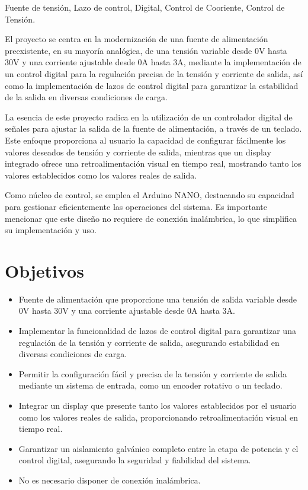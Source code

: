 
\begin{resumen}{Fuente de tensión, Lazo de control, Digital, Control de Cooriente, Control de Tensión.}

El proyecto se centra en la modernización de una fuente de alimentación preexistente, en su mayoría analógica, de una tensión variable desde 0V hasta 30V y una corriente ajustable desde 0A hasta 3A, mediante la implementación de un control digital para la regulación precisa de la tensión y corriente de salida, así como la implementación de lazos de control digital para garantizar la estabilidad de la salida en diversas condiciones de carga. 

La esencia de este proyecto radica en la utilización de un controlador digital de señales para ajustar la salida de la fuente de alimentación, a través de un teclado. Este enfoque proporciona al usuario la capacidad de configurar fácilmente los valores deseados de tensión y corriente de salida, mientras que un display integrado ofrece una retroalimentación visual en tiempo real, mostrando tanto los valores establecidos como los valores reales de salida.

Como núcleo de control, se emplea el Arduino NANO, destacando su capacidad para gestionar eficientemente las operaciones del sistema. Es importante mencionar que este diseño no requiere de conexión inalámbrica, lo que simplifica su implementación y uso.\par

\section*{Objetivos}

\begin{itemize}
    \item Fuente de alimentación que proporcione una tensión de salida variable desde 0V hasta 30V y una corriente ajustable desde 0A hasta 3A.
    \item Implementar la funcionalidad de lazos de control digital para garantizar una regulación de la tensión y corriente de salida, asegurando estabilidad en diversas condiciones de carga.
    \item Permitir la configuración fácil y precisa de la tensión y corriente de salida mediante un sistema de entrada, como un encoder rotativo o un teclado.
    \item Integrar un display que presente tanto los valores establecidos por el usuario como los valores reales de salida, proporcionando retroalimentación visual en tiempo real.
    \item Garantizar un aislamiento galvánico completo entre la etapa de potencia y el control digital, asegurando la seguridad y fiabilidad del sistema.
    \item No es necesario disponer de conexión inalámbrica.
\end{itemize}

\end{resumen}
